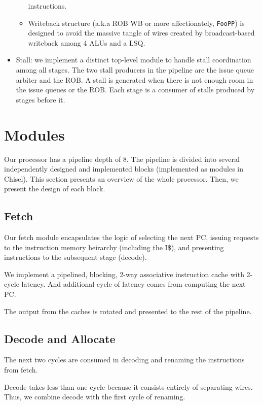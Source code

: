 \documentclass{article}
\begin{document}
\begin{itemize}
\begin{itemize}
                instructions.
            \item Writeback structure (a.k.a ROB WB or more affectionately,
                \texttt{FooPP}) is designed to avoid the massive tangle of wires
                created by broadcast-based writeback among 4 ALUs and a LSQ.
        \end{itemize}
    \item Stall: we implement a distinct top-level module to handle stall
        coordination among all stages. The two stall producers in the pipeline
        are the issue queue arbiter and the ROB. A stall is generated when there
        is not enough room in the issue queues or the ROB. Each stage is a
        consumer of stalls produced by stages before it.
\end{itemize}

\section{Modules}

Our processor has a pipeline depth of 8. The pipeline is divided into several
independently designed and implemented blocks (implemented as modules in
Chisel). This section presents an overview of the whole processor. Then, we
present the design of each block.

\subsection{Fetch}

Our fetch module encapsulates the logic of selecting the next PC, issuing
requests to the instruction memory heirarchy (including the I\$), and presenting
instructions to the subsequent stage (decode).

We implement a pipelined, blocking, 2-way associative instruction cache with
2-cycle latency. And additional cycle of latency comes from computing the next
PC.

The output from the caches is rotated and presented to the rest of the pipeline.

\subsection{Decode and Allocate}

The next two cycles are consumed in decoding and renaming the instructions from
fetch.

Decode takes less than one cycle because it consists entirely of separating
wires. Thus, we combine decode with the first cycle of renaming.
\end{document}
